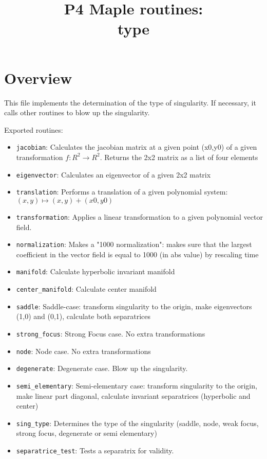 \documentclass[a4paper,10pt]{article}
\title{P4 Maple routines:\\type}
\author{}
\date{}
\begin{document}
\maketitle

\section{Overview}

This file implements the determination of the type of singularity.  If necessary, it calls other routines to blow up
the singularity.

Exported routines:

\begin{itemize}
\item \verb+jacobian+:
    Calculates the jacobian matrix at a given point (x0,y0) of a given transformation $f: R^2\to R^2$.
    Returns the 2x2 matrix as a list of four elements
\item \verb+eigenvector+:
    Calculates an eigenvector of a given 2x2 matrix
\item \verb+translation+:
    Performs a translation of a given polynomial system:  $(x,y) \mapsto (x,y) + (x0,y0)$
\item \verb+transformation+:
    Applies a linear transformation to a given polynomial vector field.
\item \verb+normalization+:
    Makes a "1000 normalization":  makes sure that the largest coefficient in the vector field is
    equal to 1000 (in abs value) by rescaling time
\item \verb+manifold+:
    Calculate hyperbolic invariant manifold
\item \verb+center_manifold+:
    Calculate center manifold
\item \verb+saddle+:
    Saddle-case:  transform singularity to the origin, make eigenvectors (1,0) and (0,1), calculate both separatrices
\item \verb+strong_focus+:
    Strong Focus case.  No extra transformations
\item \verb+node+:
    Node case.  No extra transformations
\item \verb+degenerate+:
    Degenerate case.  Blow up the singularity.
\item \verb+semi_elementary+:
    Semi-elementary case: transform singularity to the origin, make linear part diagonal, calculate
    invariant separatrices (hyperbolic and center)
\item \verb+sing_type+:
    Determines the type of the singularity (saddle, node, weak focus, strong focus, degenerate or semi elementary)
\item \verb+separatrice_test+:
    Tests a separatrix for validity.
\end{itemize}
\end{document}
